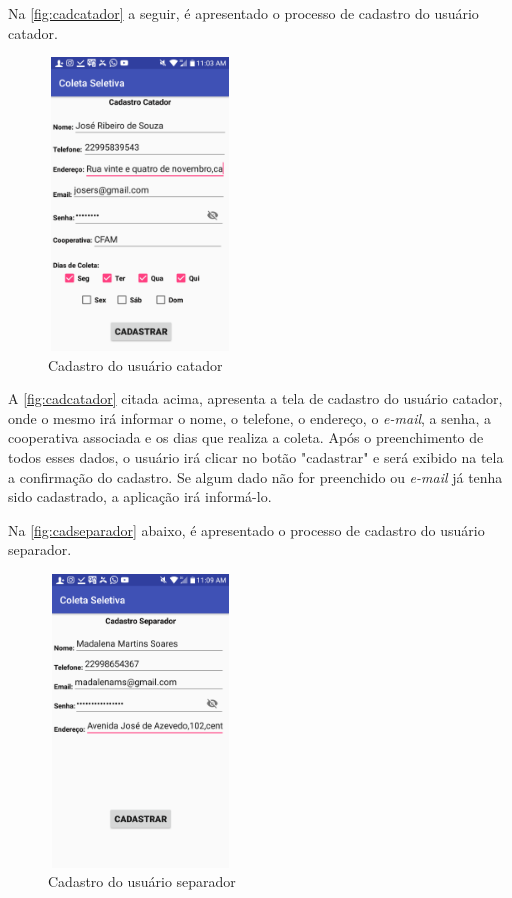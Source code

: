 Na \autoref{fig:cadcatador} a seguir, é apresentado o processo de cadastro do usuário catador.


\begin{figure}[H]
	\begin{Center}
		\includegraphics[width=1.92in,height=3.06in]{./media/image5.png}
	\end{Center}
\caption{Cadastro do usuário catador}
\label{fig:cadcatador}
\end{figure}


A \autoref{fig:cadcatador} citada acima, apresenta a tela de cadastro do usuário catador, onde o mesmo irá informar o nome, o telefone, o endereço, o \textit{e-mail}, a senha, a cooperativa associada e os dias que realiza a coleta. Após o preenchimento de todos esses dados, o usuário irá clicar no botão "cadastrar" e será exibido na tela a confirmação do cadastro. Se algum dado não for preenchido ou \textit{e-mail} já tenha sido cadastrado, a aplicação irá informá-lo.

Na \autoref{fig:cadseparador} abaixo, é apresentado o processo de cadastro do usuário separador. 

\begin{figure}[H]
	\begin{Center}
		\includegraphics[width=1.93in,height=3.06in]{./media/image3.png}
	\end{Center}
	\caption{Cadastro do usuário separador}
	\label{fig:cadseparador}
\end{figure}

